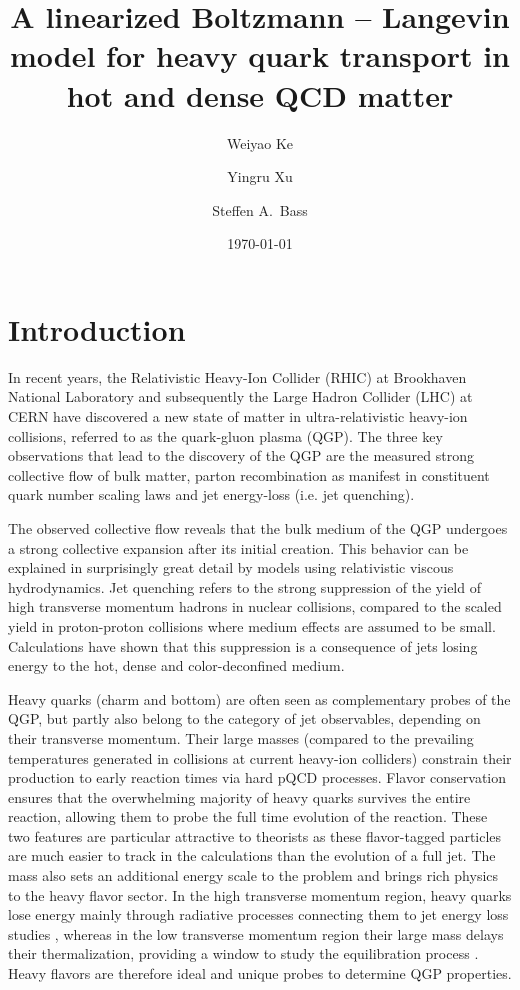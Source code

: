 \documentclass[aps, prc, reprint, amsmath, groupedaddress, nofootinbib]{revtex4-1}
\begin{document}
\title{A linearized Boltzmann -- Langevin model for heavy quark transport in hot and dense QCD matter}
\author{Weiyao Ke}
\author{Yingru Xu}
\author{Steffen A.\ Bass}
\date{\today}
\maketitle

\section{Introduction}
In recent years, the Relativistic Heavy-Ion Collider (RHIC) at Brookhaven National Laboratory and subsequently the Large Hadron Collider (LHC) at CERN have discovered a new state of matter in ultra-relativistic heavy-ion collisions, referred to as the quark-gluon plasma (QGP).
The three key observations that lead to  the discovery of the QGP are the measured strong collective flow of bulk matter, parton recombination as manifest in constituent quark number scaling laws and jet energy-loss (i.e.  jet quenching). 

The observed collective flow reveals that the bulk medium of the QGP undergoes a strong collective expansion after its initial creation.
This behavior can be  explained in surprisingly great detail by models using  relativistic viscous hydrodynamics.
Jet quenching refers to the strong suppression of the yield of high transverse momentum hadrons in nuclear collisions, compared to the scaled yield in proton-proton collisions where medium effects are assumed to be small.
Calculations have shown that this suppression is a consequence of jets losing energy to the hot, dense and color-deconfined medium. 


Heavy quarks (charm and bottom) are often seen as complementary probes of the QGP, but partly also belong to the category of jet observables, depending on their transverse momentum.  Their large masses (compared to the prevailing temperatures generated in collisions at current heavy-ion colliders)  constrain their production to early reaction times via hard pQCD processes. Flavor conservation ensures that the overwhelming majority of heavy quarks survives the entire reaction, allowing them to probe the full time evolution of the reaction.
These two features are particular attractive to theorists as these flavor-tagged particles are much easier to track in the calculations than the evolution of a full jet.
The mass also sets an additional energy scale to the problem and brings rich physics to the heavy flavor sector.
In the high transverse momentum region, heavy quarks lose energy mainly through radiative processes connecting them to jet energy loss studies \cite{Wicks:2007am, Djordjevic:2004nq, Xu:2014tda, Kang:2016ofv}, whereas
in the low transverse momentum region their large  mass delays their thermalization, providing a window to study the equilibration process \cite{Moore:2004tg,Riek:2010fk,Cao:2013ita}.
Heavy flavors are therefore ideal and unique probes to determine QGP properties.
\end{document}
